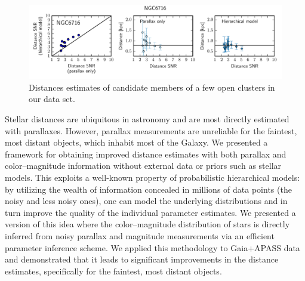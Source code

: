 \documentclass[manuscript, letterpaper]{aastex6}
\makeatletter
\let\origsection\section
\renewcommand\section{\@ifstar{\starsection}{\nostarsection}}
\newcommand\nostarsection[1]{\sectionprelude\origsection{#1}}
\newcommand\starsection[1]{\sectionprelude\origsection*{#1}}
\newcommand\sectionprelude{\vspace{1em}}
\makeatother
\begin{document}
\begin{figure}
\hspace*{-3mm}\includegraphics[width=15.5cm, trim = 0cm 0cm 0cm 0.6cm, clip]{NGC6716_metrics}
\caption{Distances estimates of candidate members of a few open clusters in our data set.}
\label{fig:oc_metrics}
\end{figure}


\section{Conclusion}\label{sec:concl}

Stellar distances are ubiquitous in astronomy and are most directly estimated with parallaxes. 
However, parallax measurements are unreliable for the faintest, most distant objects, which inhabit most of the Galaxy. 
We presented a framework for obtaining improved distance estimates with both parallax and color--magnitude information without external data or priors such as stellar models. 
This exploits a well-known property of probabilistic hierarchical models: by utilizing the wealth of information concealed in millions of data points (the noisy and less noisy ones), one can model the underlying distributions and in turn improve the quality of the individual parameter estimates. 
We presented a version of this idea where the color--magnitude distribution of stars is directly inferred from noisy parallax and magnitude measurements via an efficient parameter inference scheme.
We applied this methodology to Gaia+APASS data and demonstrated that it leads to significant improvements in the distance estimates, specifically for the faintest, most distant objects.
\end{document}

